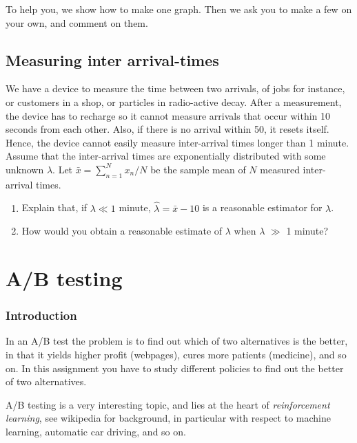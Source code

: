 \documentclass[a4paper]{article}
\begin{document}
To help you, we show how to make one graph. Then we ask you to make a few on your own, and comment on them.



\subsection{Measuring inter arrival-times}
\label{sec:orgf820334}

We have a device to measure the time between two arrivals, of jobs for instance, or customers in a shop, or particles in radio-active decay.
After a measurement, the device has to recharge so it cannot measure arrivals that occur within 10 seconds from each other.
Also, if there is no arrival within 50, it resets itself.
Hence, the device cannot easily measure inter-arrival times longer than 1 minute. Assume that the inter-arrival times are exponentially distributed with some unknown \(\lambda\). Let \(\bar x = \sum_{n=1}^N x_{n} /N\) be the sample mean of \(N\) measured inter-arrival times. 

\begin{enumerate}
\item Explain that, if \(\lambda \ll 1\) minute,  \(\hat \lambda = \bar x - 10\) is a reasonable estimator for \(\lambda\).
\item How would you obtain a reasonable estimate of \(\lambda\) when \(\lambda\) \(\gg\) 1 minute?
\end{enumerate}





\section{A/B testing}
\label{sec:org180b96a}
\subsubsection{Introduction}
\label{sec:org41a02a9}

In an A/B test the problem is to find out which of two alternatives is the better, in that it yields higher profit (webpages), cures more patients (medicine), and so on. In this assignment you have to study different policies to find out the better of two alternatives. 

A/B testing is a very interesting topic, and lies at the heart of \emph{reinforcement learning}, see wikipedia for background, in particular with respect to machine learning, automatic car driving, and so on. 
\end{document}
